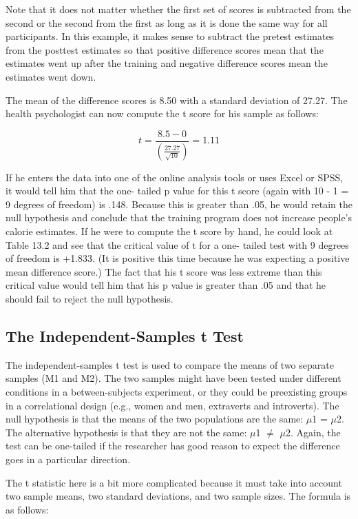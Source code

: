 Note that it does not matter whether the first set of scores is subtracted from the second or the second from the
first as long as it is done the same way for all participants. In this example, it makes sense to subtract the pretest estimates from the posttest estimates so that positive difference scores mean that the estimates went up after the training and negative difference scores mean the estimates went down.


The mean of the difference scores is 8.50 with a standard deviation of 27.27. The health psychologist can now compute the t score for his sample as follows:


\begin{equation}
t = \frac{8.5-0}{\left( \frac{27.27}{\sqrt{10}} \right) } = 1.11
\end{equation}

If he enters the data into one of the online analysis tools or uses Excel or SPSS, it would tell him that the one- tailed p value for this t score (again with 10 - 1 = 9 degrees of freedom) is .148. Because this is greater than .05, he would retain the null hypothesis and conclude that the training program does not increase people's calorie estimates. If he were to compute the t score by hand, he could look at Table 13.2 and see that the critical value of t for a one- tailed test with 9 degrees of freedom is +1.833. (It is positive this time because he was expecting a positive mean difference score.) The fact that his t score was less extreme than this critical value would tell him that his p value is greater than .05 and that he should fail to reject the null hypothesis.


\subsection{The Independent-Samples t Test}

The independent-samples t test is used to compare the means of two separate samples (M1 and M2). The two samples might have been tested under different conditions in a between-subjects experiment, or they could be preexisting groups in a correlational design (e.g., women and men, extraverts and introverts). The null hypothesis is that the means of the two populations are the same: $\mu$1 = $\mu$2. The alternative hypothesis is that they are not the same: $\mu$1 $\neq$  $\mu$2. Again, the test can be one-tailed if the researcher has good reason to expect the difference goes in a particular direction.


The t statistic here is a bit more complicated because it must take into account two sample means, two standard deviations, and two sample sizes. The formula is as follows:


